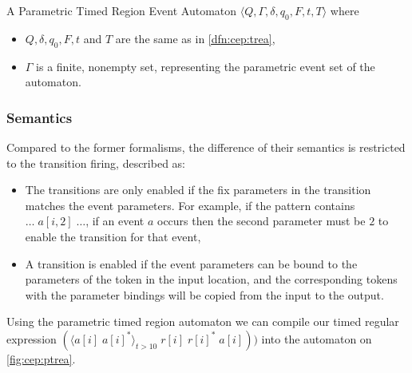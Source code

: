 			

			\begin{dfn}
				\label{dfn:cep:ptrea}
				A Parametric Timed Region Event Automaton $\langle Q,\Gamma,\delta,q_0, F, t, T \rangle$ where
				\begin{itemize}
					\item $Q, \delta, q_0, F, t$ and  $T$ are the same as in \cref{dfn:cep:trea},
					\item $\Gamma$ is a finite, nonempty set, representing the parametric event set of the automaton.
				\end{itemize}
			\end{dfn}

			\subsubsection{Semantics}
			\label{cep:trea:semantics}

			Compared to the former formalisms, the difference of their semantics is restricted to the transition firing, described as:
			\begin{itemize}
				\item The transitions are only enabled if the fix parameters in the transition matches the event parameters. For example, if the pattern contains $\dots \; a[i,2] \; \dots$, if an event $a$ occurs then the second parameter must be $2$ to enable the transition for that event,
				\item A transition is enabled if the event parameters can be bound to the parameters of the token in the input location, and the corresponding tokens with the parameter bindings will be copied from the input to the output.
			\end{itemize}
	
			Using the parametric timed region automaton we can compile our timed regular expression 
			$(\langle a[i] \;  a[i]^\ast \rangle_{t > 10} \; r[i] \; r[i]^\ast \; a[i]) )$ into the automaton on \cref{fig:cep:ptrea}.
	
